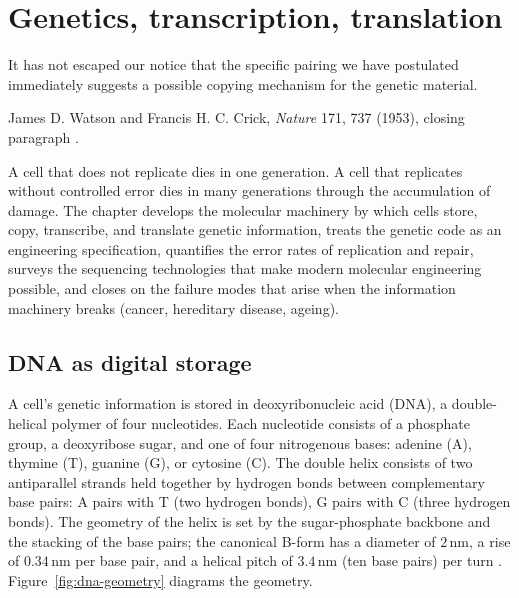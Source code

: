 \chapter{Genetics, transcription, translation}
\label{vol06:ch03}

\epigraph{It has not escaped our notice that the specific pairing we
have postulated immediately suggests a possible copying mechanism for
the genetic material.}{James D. Watson and Francis H. C. Crick,
\emph{Nature} 171, 737 (1953), closing paragraph
\cite[p.~738]{paper:watson-crick1953}.}


\noindent
A cell that does not replicate dies in one generation. A cell that
replicates without controlled error dies in many generations through
the accumulation of damage. The chapter develops the molecular
machinery by which cells store, copy, transcribe, and translate
genetic information, treats the genetic code as an engineering
specification, quantifies the error rates of replication and repair,
surveys the sequencing technologies that make modern molecular
engineering possible, and closes on the failure modes that arise when
the information machinery breaks (cancer, hereditary disease, ageing).

\section{DNA as digital storage}

A cell's genetic information is stored in deoxyribonucleic acid (DNA),
a double-helical polymer of four nucleotides. Each nucleotide consists
of a phosphate group, a deoxyribose sugar, and one of four nitrogenous
bases: adenine (A), thymine (T), guanine (G), or cytosine (C). The
double helix consists of two antiparallel strands held together by
hydrogen bonds between complementary base pairs: A pairs with T
(two hydrogen bonds), G pairs with C (three hydrogen bonds). The
geometry of the helix is set by the sugar-phosphate backbone and the
stacking of the base pairs; the canonical B-form has a diameter of
$2\,\text{nm}$, a rise of $0.34\,\text{nm}$ per base pair, and a
helical pitch of $3.4\,\text{nm}$ (ten base pairs) per turn
\cite{paper:watson-crick1953}. Figure~\ref{fig:dna-geometry}
diagrams the geometry.

